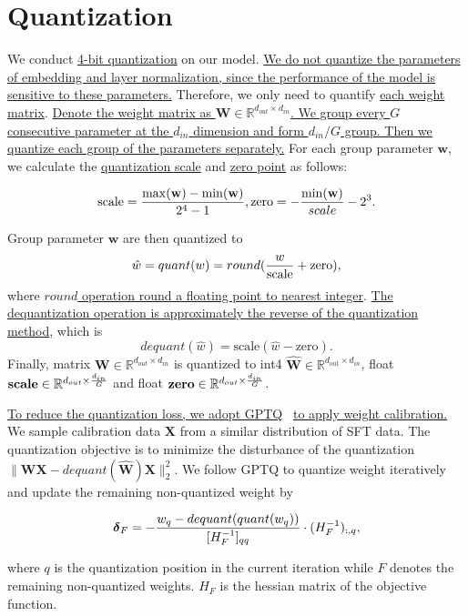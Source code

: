 \section{Quantization}
\label{app:quantization}

We conduct \uline{4-bit quantization} on our model. \uline{We do not quantize the parameters of embedding and layer normalization, since the performance of the model is sensitive to these parameters.} Therefore, we only need to quantify \uline{each weight matrix}. \uline{Denote the weight matrix as $\mathbf{W}\in \mathbb{R}^{d_{out}\times d_{in}}$. We group every $G$ consecutive parameter at the $d_{in}$ dimension and form $d_{in}/G$ group. Then we quantize each group of the parameters separately.} For each group parameter $\mathbf{w}$, we calculate the \uline{quantization scale} and \uline{zero point} as follows:

$$
\text{scale}= {\max(\mathbf{w}) - \min(\mathbf{w}) \over {2^4-1}}, \text{zero} = - {\min(\mathbf{w}) \over scale} - 2^3.
$$

Group parameter $\mathbf{w}$ are then quantized to $$\hat w = quant(w) = round({w\over \text{scale}}+\text{zero}),$$ where \uline{$round$ operation round a floating point to nearest integer}. \uline{The dequantization operation is approximately the reverse of the quantization method}, which is $$dequant(\hat w) = \text{scale}(\hat w - \text{zero}).$$ Finally, matrix $\mathbf{W}\in \mathbb{R}^{d_{out}\times d_{in}}$ is quantized to int4 $\mathbf{\hat{W}}\in \mathbb{R}^{d_{out}\times d_{in}}$, float $\textbf{scale}\in \mathbb{R}^{d_{out}\times {d_{in}\over G}}$ and float $\textbf{zero}\in \mathbb{R}^{d_{out}\times {d_{in}\over G}}$.

\uline{To reduce the quantization loss, we adopt GPTQ}~\citep{DBLP:journals/corr/abs-2210-17323} \uline{to apply weight calibration.}
We sample calibration data $\mathbf{X}$ from a similar distribution of SFT data. 
The quantization objective is to minimize the disturbance of the quantization $\|\mathbf{W}\mathbf{X}-dequant(\mathbf{\hat W})\mathbf{X}\|_2^2$.
We follow GPTQ to quantize weight iteratively and update the remaining non-quantized weight by

$$
\boldsymbol{\delta}_F = - {w_q-dequant(quant(w_q)) \over [H^{-1}_F]_{qq}} \cdot (H_F^{-1})_{:,q},
$$

where $q$ is the quantization position in the current iteration while $F$ denotes the remaining non-quantized weights. $H_F$ is the hessian matrix of the objective function.